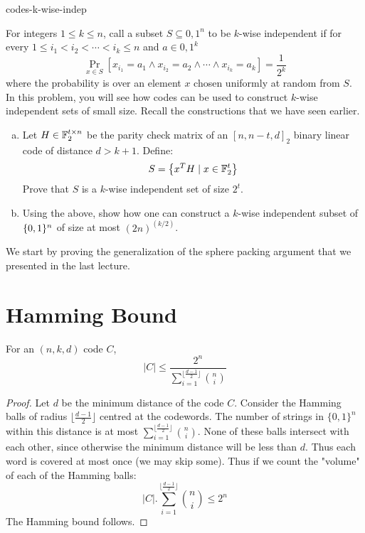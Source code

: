 \begin{exercise-prob}
\begin{show-ps5}{codes-k-wise-indep}

For integers $1 \le k \le n$, call a subset $S \subseteq {0,1}^n$ to be $k$-wise independent if for every $1 \le i_1< i_2 < \cdots < i_k \le n$ and $a \in {0,1}^k$
$$\Pr_{x \in S} [x_{i_1} = a_1 \land x_{i_2} = a_2 \land \cdots \land x_{i_k} = a_k] = \frac{1}{2^k}$$
where the probability is over an element $x$ chosen uniformly at random from $S$. In this problem, you will see how codes can be used to construct $k$-wise independent sets of small size. Recall the constructions that we have seen earlier.
\begin{enumerate}[(a)]
\item Let $H \in {\mathbb{F}}_2^{t \times n}$ be the parity check matrix of an $[n,n-t,d]_2$ binary linear code of distance $d > k+1$. Define:
$$S = \left\{ x^TH \mid x \in {\mathbb{F}}_2^t \right\}$$ 
Prove that $S$ is a $k$-wise independent set of size $2^t$.
\item Using the above, show how one can construct a $k$-wise independent subset of $\{0,1\}^n$ of size at most $(2n)^{(k/2)}$.
\end{enumerate}
\end{show-ps5}
\end{exercise-prob}


We start by proving the generalization of the sphere packing argument that we presented in the last lecture.

\section{Hamming Bound}

\begin{lemma}
For an $(n,k,d)$ code $C$,
\[ |C| \le \frac{2^n}{\sum_{i=1}^{\lfloor \frac{d-1}{2} \rfloor} {n \choose i}} \]
\end{lemma}
\begin{proof}
Let $d$ be the minimum distance of the code $C$. Consider the Hamming balls of radius $\lfloor \frac{d-1}{2} \rfloor$ centred at the codewords. The number of strings in $\{0,1\}^n$ within this distance is at most $\sum_{i=1}^{\lfloor \frac{d-1}{2} \rfloor} {n \choose i}$. None of these balls intersect with each other, since otherwise the minimum distance will be less than $d$. Thus each word is covered at most once (we may skip some). Thus if we count the "volume" of each of the Hamming balls:
\[ |C|.\sum_{i=1}^{\lfloor \frac{d-1}{2} \rfloor} {n \choose i} \le 2^n \]
The Hamming bound follows.
\end{proof}


